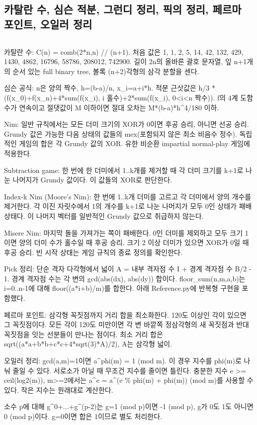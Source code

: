 \documentclass[landscape,8pt,a4paper,twocolumn]{extarticle}
\begin{document}
\subsection{카탈란 수, 심슨 적분, 그런디 정리, 픽의 정리, 페르마 포인트, 오일러 정리}
\inputminted{python}{python/Misc/Reference.py}
\noindent 카탈란 수: C(n) = comb(2*n,n) // (n+1). 처음 값은 1, 1, 2, 5, 14, 42, 132, 429, 1430, 4862, 16796, 58786, 208012, 742900. 길이 2n의 올바른 괄호 문자열, 잎 n+1개의 순서 있는 full binary tree, 볼록 (n+2)각형의 삼각 분할을 센다.\par\smallskip
\noindent 심슨 공식: n은 양의 짝수, h=(b-a)/n, x\_i=a+i*h. 적분 근삿값은 h/3 * (f(x\_0)+f(x\_n)+4*sum(f(x\_i), i 홀수)+2*sum(f(x\_i), 0<i<n 짝수)). f의 4계 도함수가 연속이고 절댓값이 M 이하이면 절대 오차는 M*(b-a)*h\textasciicircum{}4/180 이하.\par\smallskip
\noindent Nim: 일반 규칙에서는 모든 더미 크기의 XOR가 0이면 후공 승리, 아니면 선공 승리. Grundy 값은 가능한 다음 상태의 값들의 mex(포함되지 않은 최소 비음수 정수). 독립적인 게임의 합은 각 Grundy 값의 XOR. 유한 비순환 impartial normal-play 게임에 적용한다.\par\smallskip
\noindent Subtraction game: 한 번에 한 더미에서 1..k개를 제거할 때 각 더미 크기를 k+1로 나눈 나머지가 Grundy 값이다. 이 값들의 XOR로 판단한다.\par\smallskip
\noindent Index-k Nim (Moore's Nim): 한 번에 1..k개 더미를 고르고 각 더미에서 양의 개수를 제거한다. 각 이진 자릿수에서 1의 개수를 k+1로 나눈 나머지가 모두 0인 상태가 패배 상태다. 이 나머지 벡터를 일반적인 Grundy 값으로 취급하지 않는다.\par\smallskip
\noindent Misere Nim: 마지막 돌을 가져가는 쪽이 패배한다. 0인 더미를 제외하고 모두 크기 1이면 양의 더미 수가 홀수일 때 후공 승리. 크기 2 이상 더미가 있으면 XOR가 0일 때 후공 승리. 빈 시작 상태는 게임 규칙의 종료 정의를 확인한다.\par\smallskip
\noindent Pick 정리: 단순 격자 다각형에서 넓이 A = 내부 격자점 수 I + 경계 격자점 수 B/2 - 1. 경계 격자점 수는 각 변의 gcd(abs(dx), abs(dy)) 합이다. floor\_sum(n,m,a,b)는 i=0..n-1에 대해 floor((a*i+b)/m)를 합한다. 아래 Reference.py에 반복형 구현을 포함했다.\par\smallskip
\noindent 페르마 포인트: 삼각형 꼭짓점까지 거리 합을 최소화한다. 120도 이상인 각이 있으면 그 꼭짓점이다. 모든 각이 120도 미만이면 각 변 바깥쪽 정삼각형의 새 꼭짓점과 반대 꼭짓점을 잇는 선분들이 만나는 점이다. 최소 거리 합은 sqrt((a*a+b*b+c*c+4*sqrt(3)*A)/2), A는 삼각형 넓이.\par\smallskip
\noindent 오일러 정리: gcd(a,m)=1이면 a\textasciicircum{}phi(m) = 1 (mod m). 이 경우 지수를 phi(m)로 나눠 줄일 수 있다. 서로소가 아닐 때 무조건 지수를 줄이면 틀린다. 충분한 지수 e >= ceil(log2(m)), m>=2에서는 a\textasciicircum{}e = a\textasciicircum{}(e \% phi(m) + phi(m)) (mod m)를 사용할 수 있다. 작은 지수는 원래대로 계산한다.\par\smallskip
\noindent 소수 p에 대해 g\textasciicircum{}0+...+g\textasciicircum{}(p-2)는 g=1 (mod p)이면 -1 (mod p), g가 0도 1도 아니면 0 (mod p)이다. g=0이면 합은 1이므로 별도 처리한다.\par\smallskip
\end{document}
